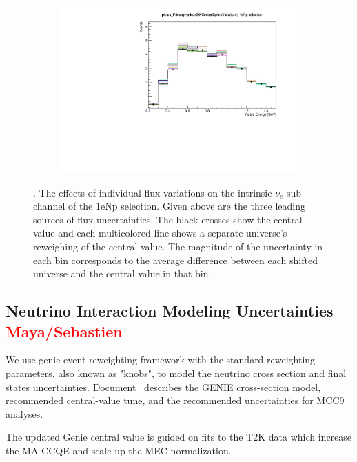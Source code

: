 \documentclass[a4paper]{article}
\begin{document}
\begin{figure}[ht]
\begin{center}
\begin{subfigure}[b]{0.33\textwidth}
    \end{subfigure}
    \begin{subfigure}[b]{0.33\textwidth}
    \centering
    \includegraphics[width=1.00\textwidth]{systvariations/Variation_nue_reco_e_genietune_run1_piplus_PrimaryHadronSWCentralSplineVariation_nu_uBooNE_nue_intrinsic.pdf}
    \end{subfigure}
\caption{\label{fig:fluxsystvars}. The effects of individual flux variations on the intrinsic $\nu_e$ sub-channel of the 1eNp selection. Given above are the three leading sources of flux uncertainties. The black crosses show the central value and each multicolored line shows a separate universe's reweighing of the central value. The magnitude of the  uncertainty in each bin corresponds to the average difference between each shifted universe and the central value in that bin.}
\end{center}
\end{figure}

\subsection{Neutrino Interaction Modeling Uncertainties \textcolor{red}{Maya/Sebastien}}
We use genie event reweighting framework with the standard reweighting parameters, also known as "knobs", to model the neutrino cross section and final states uncertainties. Document~\cite{bib:geniesupportnote} describes the GENIE cross-section model, recommended central-value tune, and the recommended uncertainties for MCC9 analyses. 

The updated Genie central value is guided on fits to the T2K data which increase the MA CCQE and scale up the MEC normalization.
\end{document}
